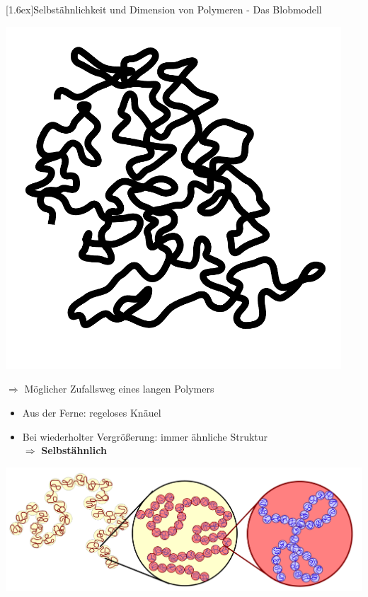 \documentclass[final]{beamer}
\newlength{\columnheight}
\newlength{\marginw}
\newlength{\tw}
\newlength{\colw}
\newenvironment{myTwoColPoster}{%
  \begin{minipage}[t]{\textwidth}%
    \hspace*{\marginw}%
    \hspace*{9.5bp}%
    \begin{minipage}[t]{\tw}}%
  {\end{minipage}%
   \hspace*{\marginw}%
   \end{minipage}}
\newenvironment{myCol}%
    {\begin{minipage}[t][\columnheight][t]{\colw}}%
    {\end{minipage}}
\newenvironment{textblock}[1]%
    {\begin{block}{\rule[-0.6ex]{0pt}{2.4ex}\raisebox{-0.25ex}[1.6ex]{#1}}%
     \vspace*{5mm}}%
    {\vspace*{5mm}\end{block}}
\begin{document}
\begin{frame}[t]{}
\begin{myTwoColPoster}
\begin{myCol}
\begin{textblock}{Selbst\"ahnlichkeit und Dimension von Polymeren - Das Blobmodell}
\begin{center}
\begin{minipage}[c]{0.2\textwidth}
        \includegraphics[width=0.94\textwidth]{fig/RW}
      \end{minipage}\hfill
      \begin{minipage}[c]{0.75\textwidth}
        {\Large $\Longrightarrow$ M\"oglicher Zufallsweg eines langen Polymers}\hspace*{1cm}\vspace*{0.5cm}
        \begin{itemize} \setlength\itemsep{1.1em} \Large
          \item Aus der Ferne: regeloses Kn\"auel
          \item Bei wiederholter Vergrößerung: immer ähnliche Struktur\\[1.2em]
          \textcolor{IPForange}{$\Rightarrow$ \textbf{Selbstähnlich}}
        \end{itemize}
      \end{minipage}
    \end{center}\vspace*{0.8cm}
    \includegraphics[width=1.05\textwidth]{fig/blob_chain}\vspace*{0.8cm}


\end{textblock}
\end{myCol}
\end{myTwoColPoster}
\end{frame}
\end{document}

